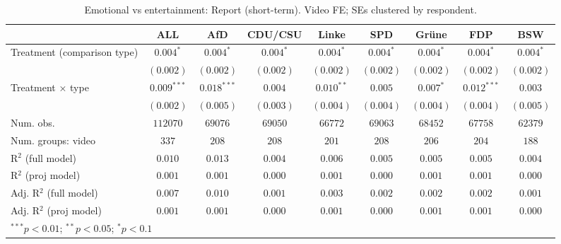 
\begin{table}
\begin{center}
\begin{tabular}{l c c c c c c c c}
\hline
 & ALL & AfD & CDU/CSU & Linke & SPD & Grüne & FDP & BSW \\
\hline
Treatment (comparison type) & $0.004^{*}$   & $0.004^{*}$   & $0.004^{*}$ & $0.004^{*}$  & $0.004^{*}$ & $0.004^{*}$ & $0.004^{*}$   & $0.004^{*}$ \\
                            & $(0.002)$     & $(0.002)$     & $(0.002)$   & $(0.002)$    & $(0.002)$   & $(0.002)$   & $(0.002)$     & $(0.002)$   \\
Treatment × type            & $0.009^{***}$ & $0.018^{***}$ & $0.004$     & $0.010^{**}$ & $0.005$     & $0.007^{*}$ & $0.012^{***}$ & $0.003$     \\
                            & $(0.002)$     & $(0.005)$     & $(0.003)$   & $(0.004)$    & $(0.004)$   & $(0.004)$   & $(0.004)$     & $(0.005)$   \\
\hline
Num. obs.                   & $112070$      & $69076$       & $69050$     & $66772$      & $69063$     & $68452$     & $67758$       & $62379$     \\
Num. groups: video          & $337$         & $208$         & $208$       & $201$        & $208$       & $206$       & $204$         & $188$       \\
R$^2$ (full model)          & $0.010$       & $0.013$       & $0.004$     & $0.006$      & $0.005$     & $0.005$     & $0.005$       & $0.004$     \\
R$^2$ (proj model)          & $0.001$       & $0.001$       & $0.000$     & $0.001$      & $0.000$     & $0.001$     & $0.001$       & $0.000$     \\
Adj. R$^2$ (full model)     & $0.007$       & $0.010$       & $0.001$     & $0.003$      & $0.002$     & $0.002$     & $0.002$       & $0.001$     \\
Adj. R$^2$ (proj model)     & $0.001$       & $0.001$       & $0.000$     & $0.001$      & $0.000$     & $0.001$     & $0.001$       & $0.000$     \\
\hline
\multicolumn{9}{l}{\scriptsize{$^{***}p<0.01$; $^{**}p<0.05$; $^{*}p<0.1$}}
\end{tabular}
\caption{Emotional vs entertainment: Report (short-term). Video FE; SEs clustered by respondent.}
\label{tab:compare_emotional_vs_entertainment_report}
\end{center}
\end{table}
